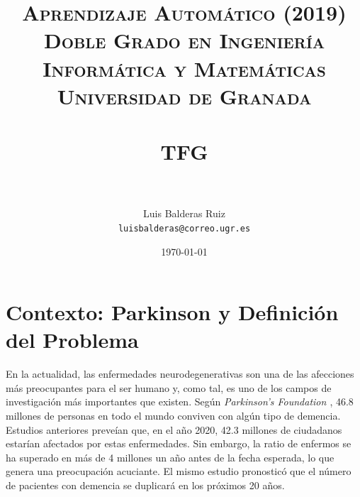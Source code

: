 
\graphicspath{ {./images/} }
\usepackage{subcaption}
\usepackage{hyperref}
\usepackage{soul}
\usepackage{amssymb}



\title{	
	\normalfont \normalsize 
	\textsc{\textbf{Aprendizaje Automático (2019)} \\ Doble Grado en Ingeniería Informática y Matemáticas \\ Universidad de Granada} \\ [25pt] %
	\horrule{0.5pt} \\[0.4cm] %
	\huge TFG \\ %
	\horrule{2pt} \\[0.5cm] %
}

\author{Luis Balderas Ruiz \\ \texttt{luisbalderas@correo.ugr.es}} 


\date{\normalsize\today} %



	
	\maketitle %
	
	\newpage %
	
	\tableofcontents %
	
	\listoffigures
	
	\listoftables
	
	\newpage




\section{Contexto: Parkinson y Definición del Problema}

En la actualidad, las enfermedades neurodegenerativas son una de las afecciones más preocupantes para el ser humano y, como tal, es uno de los campos de investigación más importantes que existen. Según \textit{Parkinson's Foundation \cite{pf}}, 46.8 millones de personas en todo el mundo conviven con algún tipo de demencia. Estudios anteriores preveían que, en el año 2020, 42.3 millones de ciudadanos estarían afectados por estas enfermedades. Sin embargo, la ratio de enfermos se ha superado en más de 4 millones un año antes de la fecha esperada, lo que genera una preocupación acuciante. El mismo estudio pronosticó que el número de pacientes con demencia se duplicará en los próximos 20 años. \\

